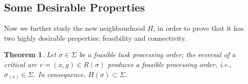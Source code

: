 \documentclass[letterpaper]{article}
\newtheorem{theorem}{Theorem}
\begin{document}
\subsection{Some Desirable Properties}
Now we further study the new neighbourhood $H$, in order to prove that it has two highly desirable properties: feasibility and connectivity.
\begin{theorem}\label{thFeasibilityH2}
Let $\sigma \in \Sigma$ be a feasible task processing order; the reversal of a critical arc $v=(x,y) \in R(\sigma)$ produces a feasible processing order, i.e., $\sigma_{(v)} \in \Sigma$. In consequence, $H(\sigma) \subset \Sigma$.
\end{theorem}
\end{document}
